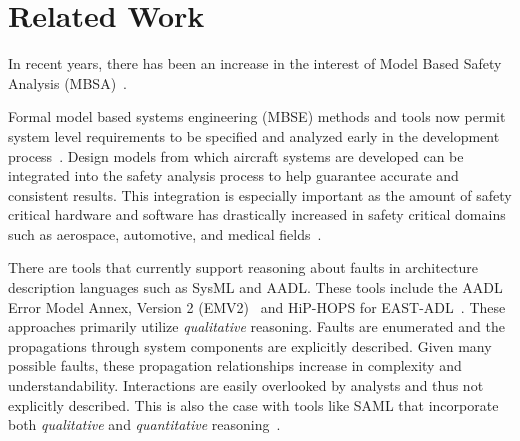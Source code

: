 \section{Related Work}
\label{sec:related_work}

In recent years, there has been an increase in the interest of Model Based Safety Analysis (MBSA)~\cite{Bozzano:2010:DSA:1951720}. 

Formal model based systems engineering (MBSE) methods and tools now permit system level requirements to be specified and analyzed early in the development process~\cite{QFCS15:backes,CIMATTI2015333, NFM2012:CoGaMiWhLaLu, hilt2013:MuWhRaHe}. Design models from which aircraft systems are developed can be integrated into the safety analysis process to help guarantee accurate and consistent results. This integration is especially important as the amount of safety critical hardware and software has drastically increased in safety critical domains such as aerospace, automotive, and medical fields~\cite{Stewart17:IMBSA}.

There are tools that currently support reasoning about faults in architecture description languages such as SysML and AADL. These tools include the AADL Error Model Annex, Version 2 (EMV2)~\cite{EMV2} and HiP-HOPS for EAST-ADL~\cite{CHEN201391}. These approaches primarily utilize \textit{qualitative} reasoning. Faults are enumerated and the propagations through system components are explicitly described. Given many possible faults, these propagation relationships increase in complexity and understandability. Interactions are easily overlooked by analysts and thus not explicitly described. This is also the case with tools like SAML that incorporate both \textit{qualitative} and \textit{quantitative} reasoning~\cite{Gudemann:2010:FQQ:1909626.1909813}. 


